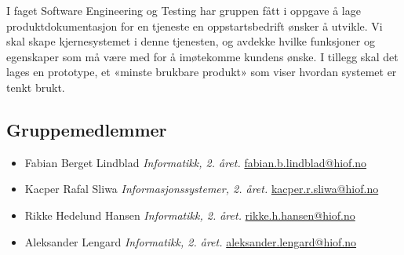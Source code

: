 \documentclass{article}
\begin{document}
I faget Software Engineering og Testing har gruppen fått i oppgave å lage produktdokumentasjon for en tjeneste en oppstartsbedrift ønsker å utvikle. Vi skal skape kjernesystemet i denne tjenesten, og avdekke hvilke funksjoner og egenskaper som må være med for å imøtekomme kundens ønske. I tillegg skal det lages en prototype, et «minste brukbare produkt» som viser hvordan systemet er tenkt brukt.  

\subsection{Gruppemedlemmer}
\begin{multicols}{2}
\begin{itemize}
    \item[] Fabian Berget Lindblad \newline
    \textit{Informatikk, 2. året. }\newline
    \href{matilto:fabian.b.lindblad@hiof.no}{fabian.b.lindblad@hiof.no}
    
    \item[] Kacper Rafal Sliwa \newline
    \textit{Informasjonssystemer, 2. året. }\newline
    \href{mailto:kacper.r.sliwa@hiof.no}{kacper.r.sliwa@hiof.no}

    \item[] Rikke Hedelund Hansen \newline
    \textit{Informatikk, 2. året. }\newline
    \href{mailto:rikke.h.hansen@hiof.no}{rikke.h.hansen@hiof.no}
    
    \item[] Aleksander Lengard \newline
    \textit{Informatikk, 2. året. }\newline
    \href{mailto:aleksander.lengard@hiof.no}{aleksander.lengard@hiof.no}
\end{itemize}
\end{multicols}














\end{document}
